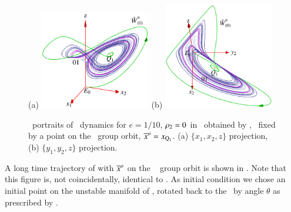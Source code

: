 %
\begin{figure}[ht]
\begin{center}
(a) \includegraphics[width=0.43\textwidth]{../figs/CLEperpReqb1}
(b) \includegraphics[width=0.43\textwidth]{../figs/CLEperpReqb}
\end{center}
\caption{
\Statesp\ portraits of \cLe\ dynamics for $e=1/10$,
$\rho_2=0$ in \reducedsp\ obtained by {\Mframes},
\slice\ fixed by a point on the
\reqv\ group orbit, ${\overline{x}^o}  = x_{\mathrm{Q}_{1}}$.
(a) $\{x_1,x_2,z\}$ projection,
(b) $\{y_1,y_2,z\}$ projection.
}
\label{fig:CLEpcSect}
\end{figure}
%
A long time trajectory of  with
${\overline{x}^o}$ on the \reqv\  group orbit is shown in
. Note that this figure is, not coincidentally,
identical to .
As initial condition we chose an initial point on the unstable manifold
of , rotated back to the \slice\ by angle $\theta$ as
prescribed by .

